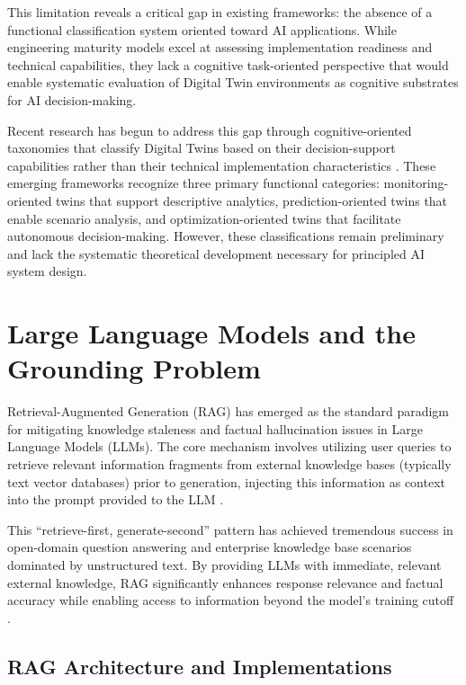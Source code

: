 This limitation reveals a critical gap in existing frameworks: the absence of a functional classification system oriented toward AI applications. While engineering maturity models excel at assessing implementation readiness and technical capabilities, they lack a cognitive task-oriented perspective that would enable systematic evaluation of Digital Twin environments as cognitive substrates for AI decision-making.

Recent research has begun to address this gap through cognitive-oriented taxonomies that classify Digital Twins based on their decision-support capabilities rather than their technical implementation characteristics \cite{jones2020cognitive, negri2017review}. These emerging frameworks recognize three primary functional categories: monitoring-oriented twins that support descriptive analytics, prediction-oriented twins that enable scenario analysis, and optimization-oriented twins that facilitate autonomous decision-making. However, these classifications remain preliminary and lack the systematic theoretical development necessary for principled AI system design.

\section{Large Language Models and the Grounding Problem}

Retrieval-Augmented Generation (RAG) has emerged as the standard paradigm for mitigating knowledge staleness and factual hallucination issues in Large Language Models (LLMs). The core mechanism involves utilizing user queries to retrieve relevant information fragments from external knowledge bases (typically text vector databases) prior to generation, injecting this information as context into the prompt provided to the LLM \cite{lewis2020retrieval, karpukhin2020dense}.

This ``retrieve-first, generate-second'' pattern has achieved tremendous success in open-domain question answering and enterprise knowledge base scenarios dominated by unstructured text. By providing LLMs with immediate, relevant external knowledge, RAG significantly enhances response relevance and factual accuracy while enabling access to information beyond the model's training cutoff \cite{guu2020retrieval}.

\subsection{RAG Architecture and Implementations}


